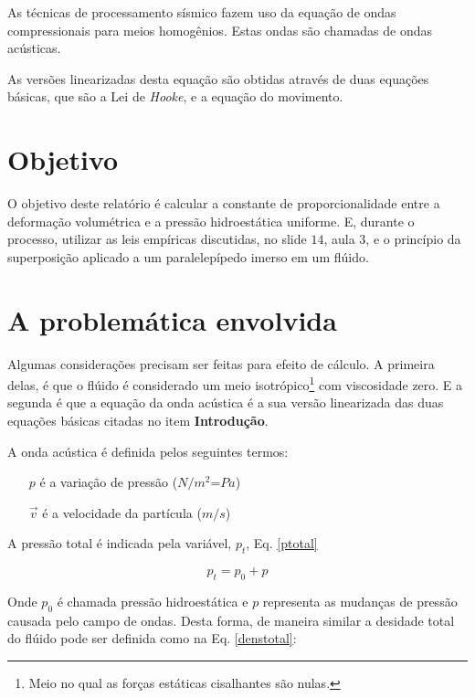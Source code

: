\documentclass[12pt,a4paper,final]{report}%
\begin{document}
As técnicas de processamento sísmico fazem uso da equação de ondas compressionais para meios homogênios. Estas ondas são chamadas de ondas acústicas. 

As versões linearizadas desta equação são obtidas através de duas equações básicas, que são a Lei de \textit{Hooke}, e a equação do movimento.   


\section*{Objetivo}

O objetivo deste relatório é calcular a constante de proporcionalidade entre a deformação volumétrica e a pressão hidroestática uniforme. E, durante o processo, utilizar as leis empíricas discutidas, no slide $14$, aula $3$, e o princípio da superposição aplicado a um paralelepípedo imerso em um flúido.



\section*{A problemática envolvida}

Algumas considerações precisam ser feitas para efeito de cálculo. A primeira delas, é que o flúido é considerado um meio isotrópico\footnote{Meio no qual as forças estáticas cisalhantes são nulas.} com viscosidade zero. E a segunda é que a equação da onda acústica é a sua versão linearizada das duas equações básicas citadas no item \textbf{Introdução}.

A onda acústica é definida pelos seguintes termos:

\begin{itemize}
\item[$p$] é a variação de pressão ($N/m^{2}$=$Pa$)
\item[$\vec{v}$] é a velocidade da partícula ($m/s$)
\end{itemize}

A pressão total é indicada pela variável, $p_{t}$, Eq. \ref{ptotal}

\begin{equation}
p_{t}=p_{0}+p
\label{ptotal}
\end{equation}

Onde $p_{0}$ é chamada pressão hidroestática e $p$ representa as mudanças de pressão causada pelo campo de ondas. Desta forma, de maneira similar a desidade total do flúido pode ser definida como na Eq. \ref{denstotal}:
\end{document}

